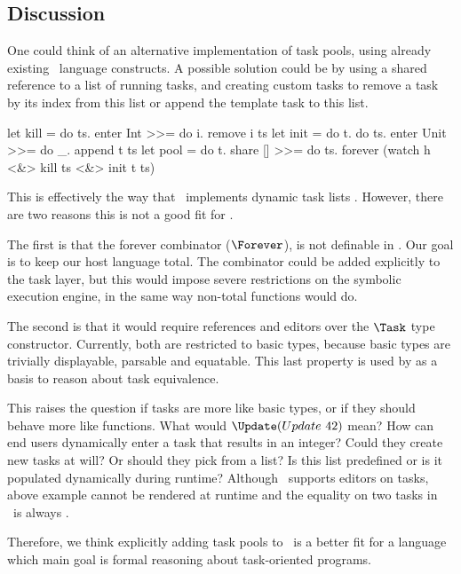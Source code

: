 
\subsection{Discussion}
\label{sec:discussion}


One could think of an alternative implementation of task pools,
using already existing \TOPHAT\ language constructs.
A possible solution could be by using a shared reference to a list of running tasks,
and creating custom tasks to remove a task by its index from this list
or append the template task to this list.
\begin{TASK}
  let kill = do ts. enter Int >>= do i. remove i ts
  let init = do t. do ts. enter Unit >>= do _. append t ts
  let pool = do t.
    share [] >>= do ts.
    forever (watch h <&> kill ts <&> init t ts)
\end{TASK}

This is effectively the way that \ITASKS\ implements dynamic task lists \cite{conf/pepm/PlasmeijerAKLNG11}.
However, there are two reasons this is not a good fit for \TOPHAT.

The first is that the forever combinator ($\Forever$), is not definable in \TOPHAT.
Our goal is to keep our host language total.
The combinator could be added explicitly to the task layer,
but this would impose severe restrictions on the symbolic execution engine,
in the same way non-total functions would do.

The second is that it would require references and editors over the $\Task$ type constructor.
Currently, both are restricted to basic types,
because basic types are trivially displayable, parsable and equatable.
This last property is used by \cite{Klijnsma2020} as a basis to reason about task equivalence.

This raises the question if tasks are more like basic types, or if they should behave more like functions.
What would $\Update (Update\ 42)$ mean?
How can end users dynamically enter a task that results in an integer?
Could they create new tasks at will?
Or should they pick from a list?
Is this list predefined or is it populated dynamically during runtime?
Although \ITASKS\ supports editors on tasks,
above example cannot be rendered at runtime and the equality on two tasks in \ITASKS\ is always .

Therefore, we think explicitly adding task pools to \TOPHAT\ is a better fit for a language which main goal is formal reasoning about task-oriented programs.
